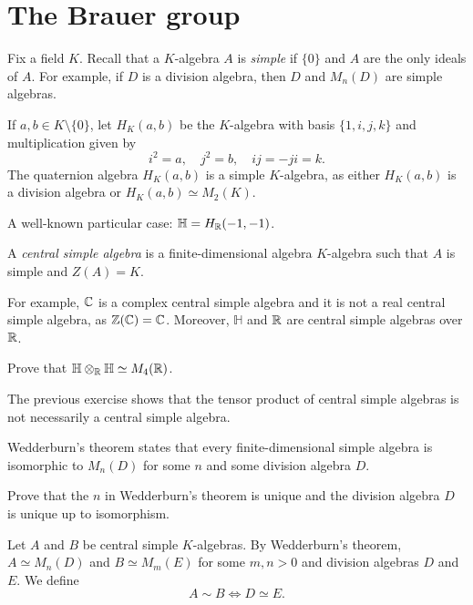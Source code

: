 \section{The Brauer group}

Fix a field $K$. Recall that a $K$-algebra $A$ is \emph{simple} 
if $\{0\}$ and $A$ are the only ideals of $A$. 
For example, if $D$ is a division algebra, then $D$ and $M_n(D)$ are simple algebras. 

\begin{example}
    If $a,b\in K\setminus\{0\}$, let $H_K(a,b)$ be the $K$-algebra 
    with basis $\{1,i,j,k\}$ and multiplication given by
    \[
    i^2=a,\quad
    j^2=b,\quad 
    ij=-ji=k.
    \]
    The quaternion algebra $H_K(a,b)$ is a simple $K$-algebra, as either $H_K(a,b)$ is a division algebra
    or $H_K(a,b)\simeq M_2(K)$. 
\end{example}

A well-known particular case: $\mathbb{H}=H_{\mathbb{R}}(-1,-1)$. 

\begin{definition}
    A \emph{central simple algebra} is a finite-dimensional algebra $K$-algebra
    such that $A$ is simple and $Z(A)=K$.
\end{definition}

For example, $\mathbb{C}$ is a complex central simple algebra and
it is not a real central simple algebra, as $\mathbb{Z}(\mathbb{C})=\mathbb{C}$. Moreover, 
$\mathbb{H}$ and $\mathbb{R}$ are central simple algebras over $\mathbb{R}$.  

\begin{exercise}
    Prove that $\mathbb{H}\otimes_{\mathbb{R}}\mathbb{H}\simeq M_4(\mathbb{R})$.  
\end{exercise}

The previous exercise shows that the tensor product of central simple algebras is not 
necessarily a central simple algebra. 

Wedderburn's theorem states that every finite-dimensional 
simple algebra is isomorphic to $M_n(D)$ 
for some $n$ and some division algebra $D$. 

\begin{exercise}
    Prove that the $n$ in Wedderburn's theorem is unique and
    the division algebra $D$ is unique up to isomorphism. 
\end{exercise}

Let $A$ and $B$ be central simple $K$-algebras. By Wedderburn's theorem, 
$A\simeq M_n(D)$ and $B\simeq M_m(E)$ for some $m,n>0$ and 
division algebras $D$ and $E$. We define 
\[
    A\sim B\Longleftrightarrow D\simeq E.
\]

